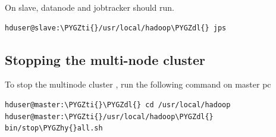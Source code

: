 \documentclass[a4paper,12pt,oneside]{sphinxmanual}
\def\PYGZdl{\char`\$}
\def\PYGZhy{\char`\-}
\def\PYGZti{\char`\~}
\begin{document}
On slave, datanode and jobtracker should run.

\begin{Verbatim}[commandchars=\\\{\}]
hduser@slave:\PYGZti{}/usr/local/hadoop\PYGZdl{} jps
\end{Verbatim}
\begin{figure}[htbp]
\centering

\end{figure}


\subsection{Stopping the multi-node cluster}
\label{document:stopping-the-multi-node-cluster}
To stop the multinode cluster , run the following command on master pc

\begin{Verbatim}[commandchars=\\\{\}]
hduser@master:\PYGZti{}\PYGZdl{} cd /usr/local/hadoop
hduser@master:\PYGZti{}/usr/local/hadoop\PYGZdl{} bin/stop\PYGZhy{}all.sh
\end{Verbatim}
\begin{figure}[htbp]
\centering

\end{figure}
\end{document}
